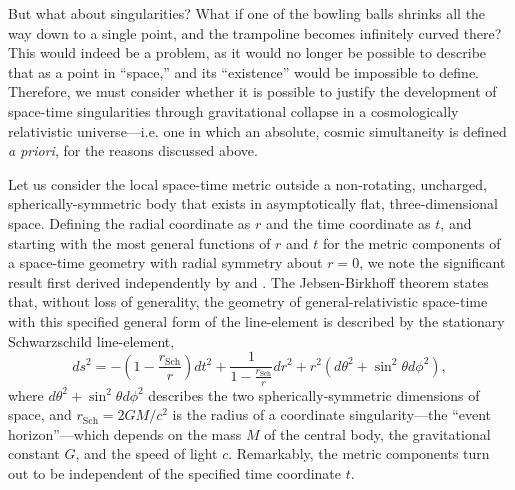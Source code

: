\documentclass[aps,rmp,groupedaddress,twocolumn,10pt]{revtex4-2}
\begin{document}
But what about singularities? What if one of the bowling balls shrinks all the way down to a single point, and the trampoline becomes infinitely curved there? This would indeed be a problem, as it would no longer be possible to describe that as a point in ``space,'' and its ``existence'' would be impossible to define. Therefore, we must consider whether it is possible to justify the development of space-time singularities through gravitational collapse in a cosmologically relativistic universe---i.e. one in which an absolute, cosmic simultaneity is defined \textit{a priori}, for the reasons discussed above. 

Let us consider the local space-time metric outside a non-rotating, uncharged, spherically-symmetric body that exists in asymptotically flat, three-dimensional space. Defining the radial coordinate as $r$ and the time coordinate as $t$, and starting with the most general functions of $r$ and $t$ for the metric components of a space-time geometry with radial symmetry about $r=0$, we note the significant result first derived independently by \citet{Jebsen1921} and \citet{Birkhoff1923}. The Jebsen-Birkhoff theorem states that, without loss of generality, the geometry of general-relativistic space-time with this specified general form of the line-element is described by the stationary Schwarzschild line-element,
\begin{equation}ds^2=-\left(1-\frac{r_{\mathrm{Sch}}}{r}\right)dt^2+\frac{1}{1-\frac{r_{\mathrm{Sch}}}{r}}dr^2+r^2(d\theta^2+\sin^2\theta d\phi^2),\label{eq:Sch}\end{equation}
where $d\theta^2+\sin^2\theta d\phi^2$ describes the two spherically-symmetric dimensions of space, and $r_{\mathrm{Sch}}=2GM/c^2$ is the radius of a coordinate singularity---the ``event horizon''---which depends on the mass $M$ of the central body, the gravitational constant $G$, and the speed of light $c$. Remarkably, the metric components turn out to be independent of the specified time coordinate $t$.
\end{document}
